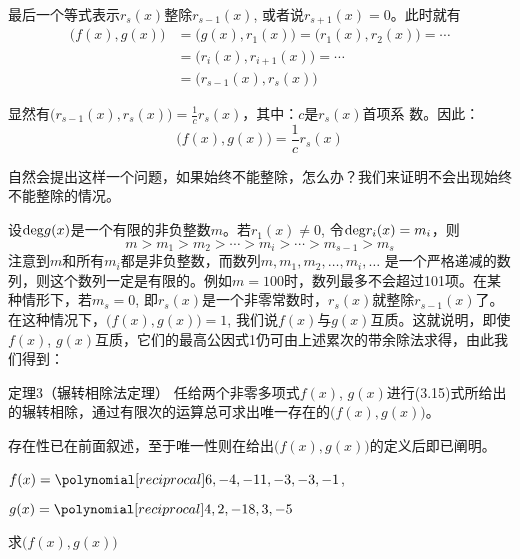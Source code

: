 最后一个等式表示$r_s(x)$整除$r_{s-1}(x)$, 或者说$r_{s+1}(x)=0$。此时就有
\[\begin{split}
    \big(f(x), g(x)\big)&=\big(g(x),r_1(x)\big)=\big(r_1(x),r_2(x)\big)=\cdots\\
    &=\big(r_i(x),r_{i+1}(x)\big)=\cdots\\
    &=\big(r_{s-1}(x),r_s(x)\big)
\end{split}\]

显然有$\big(r_{s-1}(x),r_s(x)\big)=\frac{1}{c}r_s(x)$，其中：$c$是$r_s(x)$首项系
数。因此：
\[\big(f(x), g(x)\big)=\frac{1}{c}r_s(x)\]

自然会提出这样一个问题，如果始终不能整除，怎么办？我们来证明不会出现始终不能整除的情况。

设${\rm deg}g(x)$是一个有限的非负整数$m$。若$r_1(x)\ne 0$, 令${\rm deg}r_i(x)=m_i$，则
\[m>m_1>m_2>\cdots>m_i>\cdots>m_{s-1}>m_s\]
注意到$m$和所有$m_i$都是非负整数，而数列$m,m_1,m_2,\ldots,m_i,\ldots$
是一个严格递减的数列，则这个数列一定是有限的。例如$m=100$时，数列最多不会超过101项。在某种情形下，若$m_s=0$, 即$r_s(x)$是一个非零常数时，$r_s(x)$就整除$r_{s-1}(x)$了。在这种情况下，$\big(f(x),g(x)\big)=1$, 我们说$f(x)$与$g(x)$互质。这就说明，即使$f(x)$, $g(x)$互质，它们的最高公因式1仍可由上述累次的带余除法求得，由此我们得到：

\begin{blk}{定理3（辗转相除法定理）}
  任给两个非零多项式$f(x)$, $g(x)$进行(3.15)式所给出的辗转相除，通过有限次的运算总可求出唯一存在的$\big(f(x),g(x)\big)$。
\end{blk}

 存在性已在前面叙述，至于唯一性则在给出$\big(f(x),g(x)\big)$的定义后即已阐明。  

\begin{example}
$f(x)=\poly{6,-4,-11,-3,-3,-1}$, 

$g(x)=\poly{4,2,-18,3,-5}$

求$\big(f(x),g(x)\big)$
\end{example}

